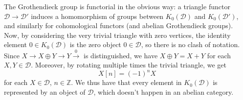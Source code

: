 The Grothendieck group is functorial in the obvious way: a triangle functor $\mathscr{D} \longrightarrow \mathscr{D}'$ induces a homomorphism of groups between $K_0(\mathscr{D})$ and $K_0(\mathscr{D}')$, and similarly for cohomological functors (and abelian Grothendieck groups). \\
Now, by considering the very trivial triangle with zero vertices, the identity element $0 \in K_0(\mathscr{D})$ is the zero object $0 \in \mathscr{D}$, so there is no clash of notation. Since $X \longrightarrow X \oplus Y \longrightarrow Y \overset{0}{\longrightarrow} $ is distinguished, we have $X \oplus Y = X + Y$ for each $X,Y \in \mathscr{D}$. Moreover, by rotating multiple times the trivial triangle, we get $$X[n]=(-1)^nX$$ 
for each $X \in \mathscr{D}$, $n \in \mathbb{Z}$. We thus have that every element in $K_0(\mathscr{D})$ is represented by an object of $\mathscr{D}$, which doesn't happen in an abelian category. \\
%
%
%

